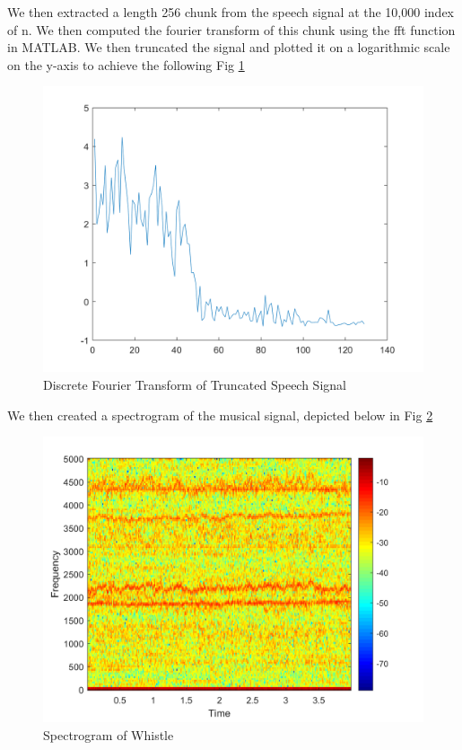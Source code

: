 \documentclass[10pt]{article}
\begin{document}
We then extracted a length 256 chunk from the speech signal at the 10,000 index of n. We then computed the fourier transform of this chunk using the fft function in MATLAB. We then truncated the signal and plotted it on a logarithmic scale on the y-axis to achieve the following Fig \ref{fig:dft}

\begin{centering}
	\begin{figure} [H]
		\centering
		\includegraphics[scale=0.22]{images/dftTruncated.png}
		\caption{Discrete Fourier Transform of Truncated Speech Signal}
		\label{fig:dft}
	\end{figure}
\end{centering}

We then created a spectrogram of the musical signal, depicted below in Fig  \ref*{fig:whistle}

\begin{centering}
	\begin{figure} [H]
		\centering
		\includegraphics[scale=0.5]{images/sig2specgram.png}
		\caption{Spectrogram of Whistle}
		\label{fig:whistle}
	\end{figure}
\end{centering}
\end{document}
